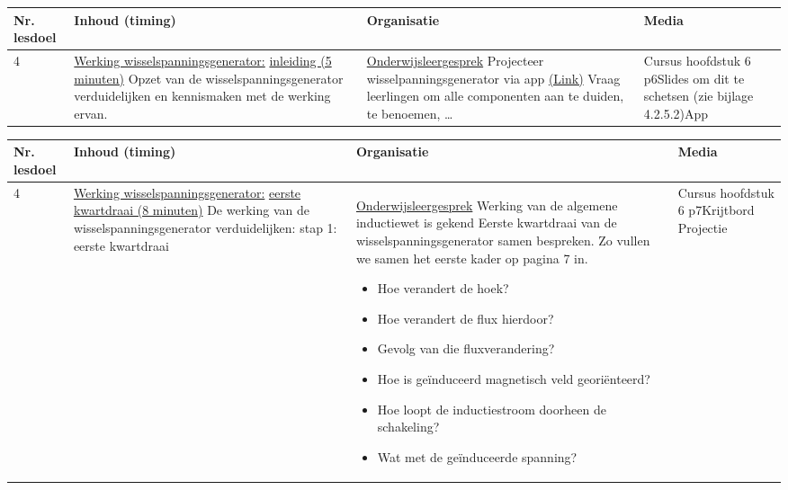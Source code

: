 \begin{landscape}
\begin{tabularx}{1.56\textwidth}{|p{1.5cm}|p{6.5cm}|X|p{4cm}|}
	\hline
	\textbf{Nr. lesdoel } & \textbf{Inhoud (timing)}  & \textbf{Organisatie } & \textbf{Media } \\ \hline
    4 & \underline{Werking wisselspanningsgenerator:} \underline{inleiding (5 minuten)}\newline
    	Opzet van de wisselspanningsgenerator verduidelijken en kennismaken met de werking ervan.
	&  \underline{Onderwijsleergesprek}\newline
	Projecteer wisselpanningsgenerator via app \href{https://www.walter-fendt.de/html5/phnl/generator_nl.htm
	}{(Link)}\newline
	Vraag leerlingen om alle componenten aan te duiden, te benoemen, \ldots 
	&  Cursus hoofdstuk 6 p6\newline\newline Slides om dit te schetsen (zie bijlage 4.2.5.2)\newline\newline App
	\\ \hline
\end{tabularx}\vspace{5mm}


\begin{tabularx}{1.56\textwidth}{|p{1.5cm}|p{6.5cm}|X|p{4cm}|}
	\hline
	\textbf{Nr. lesdoel } & \textbf{Inhoud (timing)}  & \textbf{Organisatie } & \textbf{Media } \\ \hline
	4& \underline{Werking wisselspanningsgenerator:} \underline{eerste kwartdraai (8 minuten)}\newline
	De werking van de wisselspanningsgenerator verduidelijken: stap 1: eerste kwartdraai
	&  \underline{Onderwijsleergesprek}\newline  
	Werking van de algemene inductiewet is gekend\newline
	Eerste kwartdraai van de wisselspanningsgenerator samen bespreken. Zo vullen we samen het eerste kader op pagina 7 in.\newline
	\begin{itemize}
		\item Hoe verandert de hoek?
		\item Hoe verandert de flux hierdoor?
		\item Gevolg van die fluxverandering?
		\item Hoe is geïnduceerd magnetisch veld georiënteerd?
		\item Hoe loopt de inductiestroom doorheen de schakeling?
		\item Wat met de geïnduceerde spanning?
	\end{itemize}
	&  Cursus hoofdstuk 6 p7\newline\newline Krijtbord \newline\newline Projectie
	\\ \hline
\end{tabularx}\vspace{5mm}





\end{landscape}
